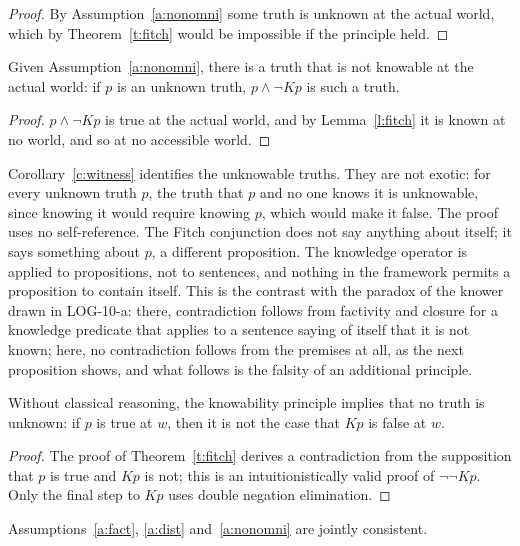 \documentclass{situationist-preprint}
\begin{document}
\begin{proof}
By Assumption~\ref{a:nonomni} some truth is unknown at the actual world, which by Theorem~\ref{t:fitch} would be impossible if the principle held.
\end{proof}

\begin{corollary}\label{c:witness}
Given Assumption~\ref{a:nonomni}, there is a truth that is not knowable at the actual world: if $p$ is an unknown truth, $p \wedge \neg Kp$ is such a truth.
\end{corollary}

\begin{proof}
$p \wedge \neg Kp$ is true at the actual world, and by Lemma~\ref{l:fitch} it is known at no world, and so at no accessible world.
\end{proof}

Corollary~\ref{c:witness} identifies the unknowable truths. They are not exotic: for every unknown truth $p$, the truth that $p$ and no one knows it is unknowable, since knowing it would require knowing $p$, which would make it false. The proof uses no self-reference. The Fitch conjunction does not say anything about itself; it says something about $p$, a different proposition. The knowledge operator is applied to propositions, not to sentences, and nothing in the framework permits a proposition to contain itself. This is the contrast with the paradox of the knower drawn in LOG-10-a: there, contradiction follows from factivity and closure for a knowledge predicate that applies to a sentence saying of itself that it is not known; here, no contradiction follows from the premises at all, as the next proposition shows, and what follows is the falsity of an additional principle.

\begin{proposition}\label{p:intuit}
Without classical reasoning, the knowability principle implies that no truth is unknown: if $p$ is true at $w$, then it is not the case that $Kp$ is false at $w$.
\end{proposition}

\begin{proof}
The proof of Theorem~\ref{t:fitch} derives a contradiction from the supposition that $p$ is true and $Kp$ is not; this is an intuitionistically valid proof of $\neg\neg Kp$. Only the final step to $Kp$ uses double negation elimination.
\end{proof}

\begin{proposition}\label{p:consistent}
Assumptions~\ref{a:fact}, \ref{a:dist} and~\ref{a:nonomni} are jointly consistent.
\end{proposition}
\end{document}
